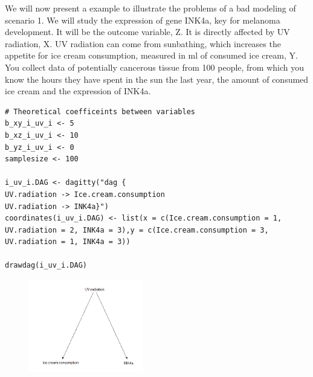 \documentclass{article}
\begin{document}
We will now present a example to illustrate the problems of a bad modeling of scenario 1. We will study the expression of gene INK4a, key for melanoma development. It will be the outcome variable, Z. It is directly affected by UV radiation, X. UV radiation can come from sunbathing, which increases the appetite for ice cream consumption, measured in ml of consumed ice cream, Y. You collect data of potentially cancerous tissue from 100 people, from which you know the hours they have spent in the sun the last year, the amount of consumed ice cream and the expression of INK4a.

\begin{lstlisting}
# Theoretical coefficeints between variables
b_xy_i_uv_i <- 5
b_xz_i_uv_i <- 10
b_yz_i_uv_i <- 0
samplesize <- 100

i_uv_i.DAG <- dagitty("dag {
UV.radiation -> Ice.cream.consumption
UV.radiation -> INK4a}")
coordinates(i_uv_i.DAG) <- list(x = c(Ice.cream.consumption = 1, UV.radiation = 2, INK4a = 3),y = c(Ice.cream.consumption = 3, UV.radiation = 1, INK4a = 3))

drawdag(i_uv_i.DAG)
\end{lstlisting}

\begin{figure}[h]
\includegraphics[width=5cm]{i_uv_i.DAG.png}
\centering
\end{figure}
\end{document}
